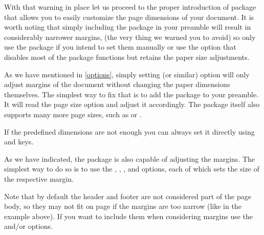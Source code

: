 With that warning in place let us proceed to the proper introduction of
 package that allows you to easily customize the page dimensions
of your document. It is worth noting that simply including the package in your
preamble will result in considerably narrower margins, (the very thing we
warned you to avoid) so only use the package if you intend to set them
manually or use the  option that disables most of the package
functions but retains the paper size adjustments.

As we have mentioned in \autoref{options}, simply setting  (or
similar) option will only adjust margins of the document without changing the
paper dimensions themselves. The simplest way to fix that is to add the
 package to your preamble. It will read the page size option
and adjust it accordingly. The package itself also supports many more page
sizes, such as  or .

If the predefined dimensions are not enough you can always set it directly
using  and  keys.

As we have indicated, the package is also capable of adjusting the margins. The
simplest way to do so is to use the , , ,
and  options, each of which sets the size of the respective
margin.
Note that by default the header and footer are not considered part of the
page body, so they may not fit on page if the margins are too narrow (like in
the example above). If you want to include them when considering margins use
the  and/or  options.

